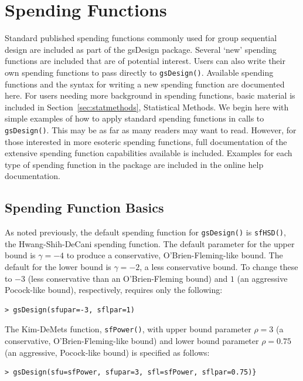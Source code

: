 \section{Spending Functions\label{sec:spendfun}}

Standard published spending functions commonly used for group sequential
design are included as part of the gsDesign package. Several `new' spending
functions are included that are of potential interest. 
Users can also write their own spending functions to pass directly
to \texttt{gsDesign()}. Available spending functions and the syntax for
writing a new spending function are documented here. For users
needing more background in spending functions, basic material is included in
Section~\ref{sec:statmethods}, Statistical Methods. We begin here with 
simple examples of how to apply 
standard spending functions in calls to \texttt{gsDesign()}. This may be as
far as many readers may want to read. However, for those interested in more
esoteric spending functions, full documentation of the extensive spending
function capabilities available is included. Examples for each type of
spending function in the package are included in the online help documentation.

\subsection{Spending Function Basics}

As noted previously, the default spending function for \texttt{gsDesign()} is
\texttt{sfHSD()}, the Hwang-Shih-DeCani spending function. The default
parameter for the upper bound is $\gamma = -4$ to produce a conservative,
O'Brien-Fleming-like bound. The default for the lower bound is $\gamma = -2$,
a less conservative bound. To change these to $-3$ (less conservative than an
O'Brien-Fleming bound) and $1$ (an aggressive Pocock-like bound), respectively,
requires only the following:

\bigskip
\begin{verbatim}
> gsDesign(sfupar=-3, sflpar=1)
\end{verbatim}
\bigskip

The Kim-DeMets function, \texttt{sfPower()}, with upper bound parameter $\rho
= 3$ (a conservative, O'Brien-Fleming-like bound) and lower bound parameter
$\rho = 0.75$ (an aggressive, Pocock-like bound) is specified as follows:

\bigskip
\begin{verbatim}
> gsDesign(sfu=sfPower, sfupar=3, sfl=sfPower, sflpar=0.75)}
\end{verbatim}
\bigskip

